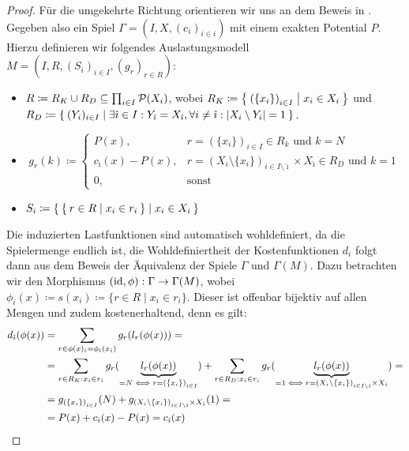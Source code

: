 \begin{proof}
		
	Für die umgekehrte Richtung orientieren wir uns an dem Beweis in \cite[Theorem 1]{MultiPotGames}. Gegeben also ein Spiel $\Gamma = (I, X, (c_i)_{i\in i})$ mit einem exakten Potential $P$. Hierzu definieren wir folgendes Auslastungsmodell $M = (I, R, (S_i)_{i \in I}, (g_r)_{r \in R})$:
	\begin{itemize}
		\item $R \coloneqq R_K \cup R_D \subseteq \prod_{i \in I}\mathcal{P}(X_i)$, wobei $R_K \coloneqq \Set{\left(\{x_i\}\right)_{i \in I} | x_i \in X_i }$ und \\ $R_D \coloneqq \Set{(Y_i)_{i \in I} | \exists \hat{\imath} \in I: Y_{\hat{\imath}} = X_{\hat{\imath}}, \forall i \neq \hat{\imath}: \left|X_i \setminus Y_i\right| = 1 }$.
		\item \[g_r(k) \coloneqq 
					\begin{cases}
						P(x), 					&r = \left(\{x_i\}\right)_{i \in I} \in R_k 													\text{ und } k=N \\
						c_{\hat{\imath}}(x) - P(x), 	&r = \left(X_i\setminus\{x_i\}\right)_{i \in I\setminus\hat{\imath}} \times X_{\hat{\imath}} \in R_D 	\text{ und } k=1 \\
						0,						&\text{sonst}
					\end{cases}\]
		\item $S_i \coloneqq \Set{ \Set{r \in R | x_i \in r_i} | x_i \in X_i }$
	\end{itemize}
	Die induzierten Lastfunktionen sind automatisch wohldefiniert, da die Spielermenge endlich ist, die Wohldefiniertheit der Kostenfunktionen $d_i$ folgt dann aus dem Beweis der Äquivalenz der Spiele $\Gamma$ und $\Gamma(M)$. Dazu betrachten wir den Morphismus $(\mathrm{id}, \phi): \Gamma \to \Gamma(M)$, wobei $\phi_i(x) \coloneqq s(x_i) \coloneqq \{r \in R \mid x_i \in r_i\}$. Dieser ist offenbar bijektiv auf allen Mengen und zudem kostenerhaltend, denn es gilt:
	\begin{align*}
		d_{\hat{\imath}}(\phi(x)) 	&=\sum_{r \in \phi(x)_{\hat{\imath}} = \phi_{\hat{\imath}}(x_{\hat{\imath}})} g_r(l_r(\phi(x))) = \\
		&=\sum_{r \in R_K: x_{\hat{\imath}} \in r_{\hat{\imath}}} g_r(\underbrace{l_r(\phi(x))}_{= N \iff r = \left(\{x_i\}\right)_{i \in I}}) + \sum_{r \in R_D: x_{\hat{\imath}} \in r_i} g_r(\underbrace{l_r(\phi(x))}_{=1 \iff r = \left(X_i\setminus\{x_i\}\right)_{i \in I\setminus\hat{\imath}} \times X_{\hat{\imath}}}) = \\
		&=g_{\left(\{x_i\}\right)_{i \in I}}(N) + g_{\left(X_i\setminus\{x_i\}\right)_{i \in I\setminus\hat{\imath}} \times X_{\hat{\imath}}}(1) = \\
		&=P(x) + c_{\hat{\imath}}(x) - P(x) = c_{\hat{\imath}}(x) \qedhere									
		\end{align*}
\end{proof}

